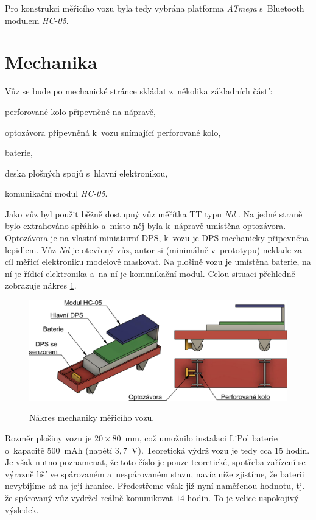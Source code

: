 Pro konstrukci měřicího vozu byla tedy vybrána platforma \textit{ATmega}
s~Bluetooth modulem \textit{HC-05}.

\section{Mechanika}
\label{sec:wsm-mech}

Vůz se bude po mechanické stránce skládat z~několika základních částí:

\begin{compactenum}
\item perforované kolo připevněné na nápravě,
\item optozávora připevněná k~vozu snímající perforované kolo,
\item baterie,
\item deska plošných spojů s~hlavní elektronikou,
\item komunikační modul \textit{HC-05}.
\end{compactenum}

Jako vůz byl použit běžně dostupný vůz měřítka TT typu \textit{Nd}
\cite{vuz-nd}. Na jedné straně bylo extrahováno spřáhlo a~místo něj byla
k~nápravě umístěna optozávora. Optozávora je na vlastní miniaturní DPS, k~vozu
je DPS mechanicky připevněna lepidlem. Vůz \textit{Nd} je otevřený vůz, autor si
(minimálně v~prototypu) neklade za cíl měřicí elektroniku modelově maskovat. Na
plošině vozu je umístěna baterie, na ní je řídicí elektronika a~na ní je
komunikační modul. Celou situaci přehledně zobrazuje nákres
\ref{fig:vuz-nakres}.

\begin{figure}[ht]
\caption{Nákres mechaniky měřicího vozu.}
\includegraphics[width=\textwidth]{data/wsm-3d.png}
\label{fig:vuz-nakres}
\end{figure}

Rozměr plošiny vozu je $20\times80$~mm, což umožnilo instalaci LiPol baterie
o~kapacitě $500$~mAh (napětí $3,7$~V). Teoretická výdrž vozu je tedy cca $15$
hodin. Je však nutno poznamenat, že toto číslo je pouze teoretické, spotřeba
zařízení se výrazně liší ve spárovaném a~nespárovaném stavu, navíc níže
zjistíme, že baterii nevybíjíme až na její hranice. Předestřeme však již nyní
naměřenou hodnotu, tj. že spárovaný vůz vydržel reálně komunikovat $14$ hodin.
To je velice uspokojivý výsledek.

